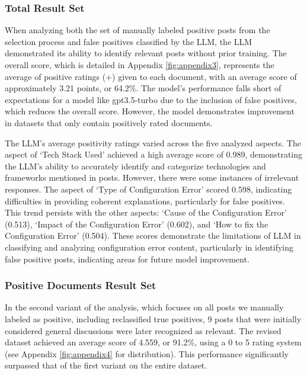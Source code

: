 \documentclass[english,bachelor]{swsLeipzig}
\begin{document}
\subsubsection{Total Result Set}

When analyzing both the set of manually labeled positive posts from the selection process and false positives classified by the LLM, the LLM demonstrated its ability to identify relevant posts without prior training. The overall score, which is detailed in Appendix 
\ref{fig:appendix3}, represents the average of positive ratings (+) given to each document, with an average score of approximately 3.21 points, or 64.2\%. The model's performance falls short of expectations for a model like gpt3.5-turbo due to the inclusion of false positives, which reduces the overall score. However, the model demonstrates improvement in datasets that only contain positively rated documents.

The LLM's average positivity ratings varied across the five analyzed aspects. The aspect of `Tech Stack Used' achieved a high average score of 0.989, demonstrating the LLM's ability to accurately identify and categorize technologies and frameworks mentioned in posts. However, there were some instances of irrelevant responses. The aspect of `Type of Configuration Error' scored 0.598, indicating difficulties in providing coherent explanations, particularly for false positives. This trend persists with the other aspects: `Cause of the Configuration Error' (0.513), `Impact of the Configuration Error' (0.602), and `How to fix the Configuration Error' (0.504). These scores demonstrate the limitations of LLM in classifying and analyzing configuration error content, particularly in identifying false positive posts, indicating areas for future model improvement.

\subsubsection{Positive Documents Result Set}

In the second variant of the analysis, which focuses on all posts we manually labeled as positive, including reclassified true positives, 9 posts that were initially considered general discussions were later recognized as relevant. The revised dataset achieved an average score of 4.559, or 91.2\%, using a 0 to 5 rating system (see Appendix 
\ref{fig:appendix4} for distribution). This performance significantly surpassed that of the first variant on the entire dataset.
\end{document}
